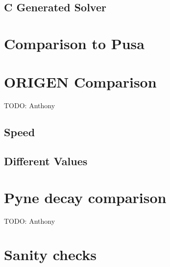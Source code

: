 \documentclass{article}
\makeatletter
\let\oldcite=\cite
\renewcommand\cite[1]{\ifthenelse{\equal{#1}{ationneeded}}{{\color{red}[citation~needed]}}{\oldcite{#1}}}
\newcommand\todo[1]{{\color{red}TODO\@: #1}}
\makeatother
\begin{document}
\subsection{C Generated Solver}
\label{sec:c-solve}


\section{Comparison to Pusa~\oldcite{pusa2012correction}}
\label{sec:pusa-comparison}


\section{ORIGEN Comparison}
\todo{Anthony}
\subsection{Speed}
\label{sec:origen-speed}

\subsection{Different Values}
\label{sec:origen-different-values}


\section{Pyne decay comparison}
\todo{Anthony}

\section{Sanity checks}
\label{sec:sanity-checks}


\clearpage

\end{document}
